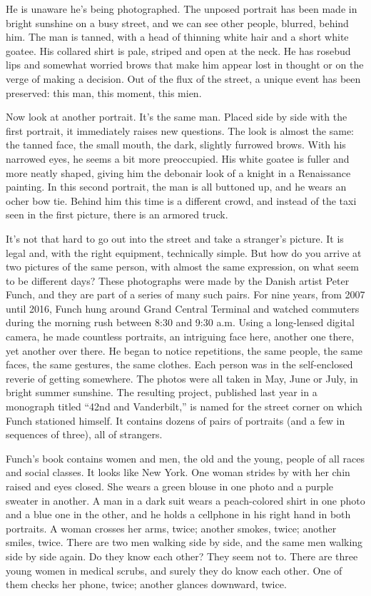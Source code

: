 He is unaware he's being photographed. The unposed portrait has been
made in bright sunshine on a busy street, and we can see other people,
blurred, behind him. The man is tanned, with a head of thinning white
hair and a short white goatee. His collared shirt is pale, striped and
open at the neck. He has rosebud lips and somewhat worried brows that
make him appear lost in thought or on the verge of making a decision.
Out of the flux of the street, a unique event has been preserved: this
man, this moment, this mien.

Now look at another portrait. It's the same man. Placed side by side
with the first portrait, it immediately raises new questions. The look
is almost the same: the tanned face, the small mouth, the dark, slightly
furrowed brows. With his narrowed eyes, he seems a bit more preoccupied.
His white goatee is fuller and more neatly shaped, giving him the
debonair look of a knight in a Renaissance painting. In this second
portrait, the man is all buttoned up, and he wears an ocher bow tie.
Behind him this time is a different crowd, and instead of the taxi seen
in the first picture, there is an armored truck.

It's not that hard to go out into the street and take a stranger's
picture. It is legal and, with the right equipment, technically simple.
But how do you arrive at two pictures of the same person, with almost
the same expression, on what seem to be different days? These
photographs were made by the Danish artist Peter Funch, and they are
part of a series of many such pairs. For nine years, from 2007 until
2016, Funch hung around Grand Central Terminal and watched commuters
during the morning rush between 8:30 and 9:30 a.m. Using a long-lensed
digital camera, he made countless portraits, an intriguing face here,
another one there, yet another over there. He began to notice
repetitions, the same people, the same faces, the same gestures, the
same clothes. Each person was in the self-enclosed reverie of getting
somewhere. The photos were all taken in May, June or July, in bright
summer sunshine. The resulting project, published last year in a
monograph titled ``42nd and Vanderbilt,'' is named for the street corner
on which Funch stationed himself. It contains dozens of pairs of
portraits (and a few in sequences of three), all of strangers.

Funch's book contains women and men, the old and the young, people of
all races and social classes. It looks like New York. One woman strides
by with her chin raised and eyes closed. She wears a green blouse in one
photo and a purple sweater in another. A man in a dark suit wears a
peach-colored shirt in one photo and a blue one in the other, and he
holds a cellphone in his right hand in both portraits. A woman crosses
her arms, twice; another smokes, twice; another smiles, twice. There are
two men walking side by side, and the same men walking side by side
again. Do they know each other? They seem not to. There are three young
women in medical scrubs, and surely they do know each other. One of them
checks her phone, twice; another glances downward, twice.

